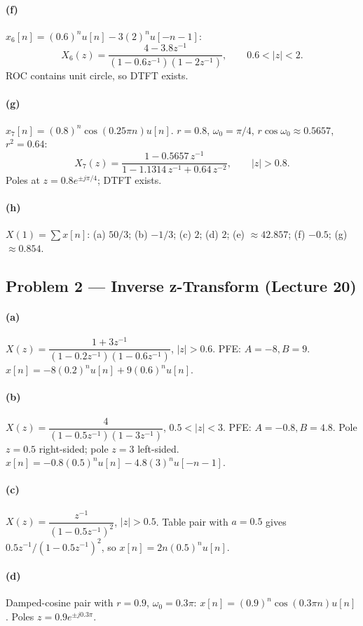 \documentclass[11pt]{article}
\begin{document}
\paragraph{(f)} $x_6[n]=(0.6)^n u[n] - 3(2)^n u[-n-1]$:
\[
X_6(z) = \frac{4-3.8 z^{-1}}{(1-0.6 z^{-1})(1-2 z^{-1})}, \qquad 0.6<|z|<2.
\]
ROC contains unit circle, so DTFT exists.

\paragraph{(g)} $x_7[n]=(0.8)^n\cos(0.25\pi n)u[n]$. $r=0.8$, $\omega_0=\pi/4$, $r\cos\omega_0 \approx 0.5657$, $r^2=0.64$:
\[
X_7(z) = \frac{1-0.5657\,z^{-1}}{1-1.1314\,z^{-1} + 0.64\,z^{-2}}, \qquad |z|>0.8.
\]
Poles at $z = 0.8 e^{\pm j\pi/4}$; DTFT exists.

\paragraph{(h)} $X(1) = \sum x[n]$: (a) $50/3$; (b) $-1/3$; (c) $2$; (d) $2$; (e) $\approx 42.857$; (f) $-0.5$; (g) $\approx 0.854$.

\subsection{Problem 2 --- Inverse z-Transform (Lecture 20)}

\paragraph{(a)} $X(z) = \dfrac{1+3z^{-1}}{(1-0.2z^{-1})(1-0.6z^{-1})}$, $|z|>0.6$. PFE: $A=-8, B=9$. $x[n] = -8(0.2)^n u[n] + 9(0.6)^n u[n]$.

\paragraph{(b)} $X(z) = \dfrac{4}{(1-0.5z^{-1})(1-3z^{-1})}$, $0.5<|z|<3$. PFE: $A=-0.8, B=4.8$. Pole $z=0.5$ right-sided; pole $z=3$ left-sided. $x[n]=-0.8(0.5)^n u[n] - 4.8(3)^n u[-n-1]$.

\paragraph{(c)} $X(z) = \dfrac{z^{-1}}{(1-0.5z^{-1})^2}$, $|z|>0.5$. Table pair with $a=0.5$ gives $0.5z^{-1}/(1-0.5z^{-1})^2$, so $x[n] = 2 n (0.5)^n u[n]$.

\paragraph{(d)} Damped-cosine pair with $r=0.9$, $\omega_0=0.3\pi$: $x[n] = (0.9)^n\cos(0.3\pi n)u[n]$. Poles $z = 0.9 e^{\pm j 0.3\pi}$.
\end{document}
